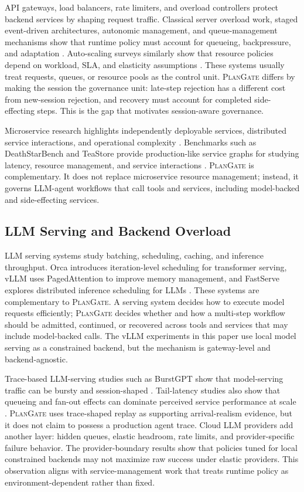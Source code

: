 \documentclass[5p,times]{elsarticle}
\newcommand{\plangate}{\textsc{PlanGate}\xspace}
\begin{document}
API gateways, load balancers, rate limiters, and overload controllers protect backend services by shaping request traffic. Classical server overload work, staged event-driven architectures, autonomic management, and queue-management mechanisms show that runtime policy must account for queueing, backpressure, and adaptation \citep{welsh2001seda,kephart2003autonomic,nichols2012codel}. Auto-scaling surveys similarly show that resource policies depend on workload, SLA, and elasticity assumptions \citep{lorido2014autoscaling}. These systems usually treat requests, queues, or resource pools as the control unit. \plangate differs by making the session the governance unit: late-step rejection has a different cost from new-session rejection, and recovery must account for completed side-effecting steps. This is the gap that motivates session-aware governance.

Microservice research highlights independently deployable services, distributed service interactions, and operational complexity \citep{dragoni2017microservices}. Benchmarks such as DeathStarBench and TeaStore provide production-like service graphs for studying latency, resource management, and service interactions \citep{gan2019deathstarbench,vonkistowski2018teastore}. \plangate is complementary. It does not replace microservice resource management; instead, it governs LLM-agent workflows that call tools and services, including model-backed and side-effecting services.

\subsection{LLM Serving and Backend Overload}

LLM serving systems study batching, scheduling, caching, and inference throughput. Orca introduces iteration-level scheduling for transformer serving, vLLM uses PagedAttention to improve memory management, and FastServe explores distributed inference scheduling for LLMs \citep{yu2022orca,kwon2023vllm,wu2023fastserve}. These systems are complementary to \plangate. A serving system decides how to execute model requests efficiently; \plangate decides whether and how a multi-step workflow should be admitted, continued, or recovered across tools and services that may include model-backed calls. The vLLM experiments in this paper use local model serving as a constrained backend, but the mechanism is gateway-level and backend-agnostic.

Trace-based LLM-serving studies such as BurstGPT show that model-serving traffic can be bursty and session-shaped \citep{wang2024burstgpt}. Tail-latency studies also show that queueing and fan-out effects can dominate perceived service performance at scale \citep{dean2013tail}. \plangate uses trace-shaped replay as supporting arrival-realism evidence, but it does not claim to possess a production agent trace. Cloud LLM providers add another layer: hidden queues, elastic headroom, rate limits, and provider-specific failure behavior. The provider-boundary results show that policies tuned for local constrained backends may not maximize raw success under elastic providers. This observation aligns with service-management work that treats runtime policy as environment-dependent rather than fixed.
\end{document}
